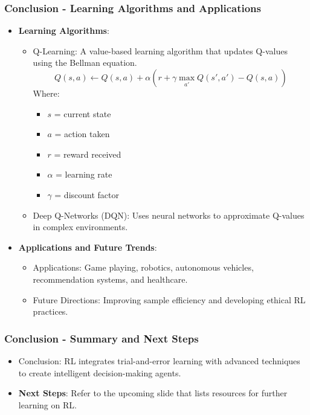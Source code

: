 \documentclass[aspectratio=169]{beamer}
\begin{document}
\begin{frame}[fragile]
    \frametitle{Conclusion - Learning Algorithms and Applications}
    \begin{itemize}
        \item \textbf{Learning Algorithms}:
            \begin{itemize}
                \item Q-Learning: A value-based learning algorithm that updates Q-values using the Bellman equation.
                    \begin{equation}
                    Q(s, a) \leftarrow Q(s, a) + \alpha \left( r + \gamma \max_{a'} Q(s', a') - Q(s, a) \right)
                    \end{equation}
                    Where:
                    \begin{itemize}
                        \item \(s\) = current state
                        \item \(a\) = action taken
                        \item \(r\) = reward received
                        \item \(\alpha\) = learning rate
                        \item \(\gamma\) = discount factor
                    \end{itemize}

                \item Deep Q-Networks (DQN): Uses neural networks to approximate Q-values in complex environments.
            \end{itemize}
        
        \item \textbf{Applications and Future Trends}:
            \begin{itemize}
                \item Applications: Game playing, robotics, autonomous vehicles, recommendation systems, and healthcare.
                \item Future Directions: Improving sample efficiency and developing ethical RL practices.
            \end{itemize}
    \end{itemize}
\end{frame}

\begin{frame}[fragile]
    \frametitle{Conclusion - Summary and Next Steps}
    \begin{itemize}
        \item Conclusion: RL integrates trial-and-error learning with advanced techniques to create intelligent decision-making agents.
        \item \textbf{Next Steps}: Refer to the upcoming slide that lists resources for further learning on RL.
    \end{itemize}
\end{frame}
\end{document}
